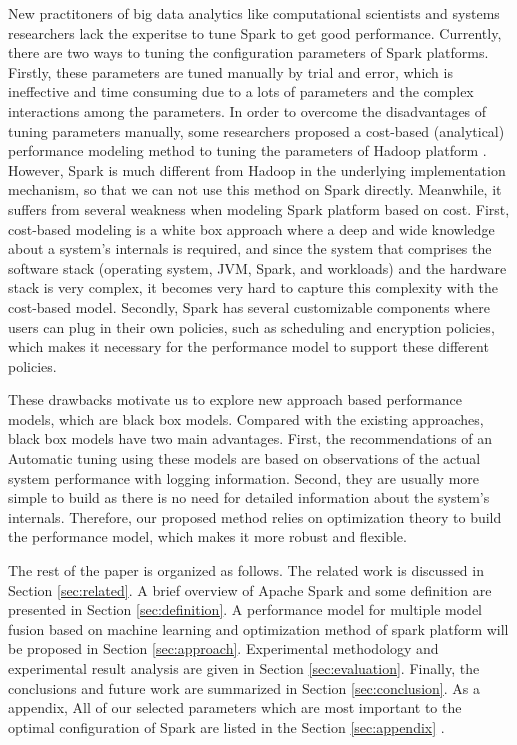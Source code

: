 \par New practitoners of big data analytics like computational scientists and systems researchers lack the experitse to tune Spark to get good performance. Currently, there are two ways to tuning the configuration parameters of Spark platforms. Firstly, these parameters are tuned manually by trial and error, which is ineffective and time consuming due to a lots of parameters and the complex interactions among the parameters. In order to overcome the disadvantages of tuning parameters manually, some researchers proposed a cost-based (analytical) performance modeling method to tuning the parameters of Hadoop platform \cite{apachehadoop}. However, Spark is much different from Hadoop in the underlying implementation mechanism, so that we can not use this method on Spark directly. Meanwhile, it suffers from several weakness when modeling Spark platform based on cost. First, cost-based modeling is a white box approach where a deep and wide knowledge about a system’s internals is required, and since the system that comprises the software stack (operating system, JVM, Spark, and workloads) and the hardware stack is very complex, it becomes very hard to capture this complexity with the cost-based model. Secondly, Spark has several customizable components where users can plug in their own policies, such as scheduling and encryption policies, which makes it necessary for the performance model to support these different policies.

\par These drawbacks motivate us to explore new approach based performance models, which are black box models. Compared with the existing approaches, black box models have two main advantages. First, the recommendations of an Automatic tuning using these models are based on observations of the actual system performance with logging information. Second, they are usually more simple to build as there is no need for detailed information about the system’s internals. Therefore, our proposed method relies on optimization theory to build the performance model, which makes it more robust and flexible.

\par The rest of the paper is organized as follows. The related work is discussed in Section \ref{sec:related}. A brief overview of Apache Spark and some definition are presented in Section \ref{sec:definition}. A performance model for multiple model fusion based on machine learning and optimization method of spark platform will be proposed in Section \ref{sec:approach}. Experimental methodology and experimental result analysis are given in Section \ref{sec:evaluation}. Finally, the conclusions and future work are summarized in Section \ref{sec:conclusion}. As a appendix, All of our selected parameters which are most important to the optimal configuration of Spark are listed in the Section \ref{sec:appendix} .
